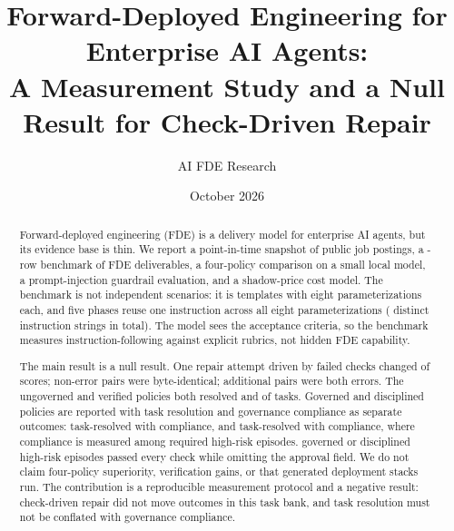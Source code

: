 \documentclass[11pt]{article}
\title{Forward-Deployed Engineering for Enterprise AI Agents:\\[0.4em]
A Measurement Study and a Null Result for Check-Driven Repair}
\author{AI FDE Research}
\date{October 2026}
\newcommand{\ResolveUngoverned}{\ResolveQwenTwoXFiveXOneXFivebUngoverned}
\newcommand{\ResolveVerified}{\ResolveQwenTwoXFiveXOneXFivebVerified}
\newcommand{\ResolveGoverned}{\ResolveQwenTwoXFiveXOneXFivebGoverned}
\newcommand{\ResolveDisciplined}{\ResolveQwenTwoXFiveXOneXFivebFdeDisciplined}
\newcommand{\GovGoverned}{\GovQwenTwoXFiveXOneXFivebGoverned}
\newcommand{\GovDisciplined}{\GovQwenTwoXFiveXOneXFivebFdeDisciplined}
\begin{document}
\maketitle

\begin{abstract}
Forward-deployed engineering (FDE) is a delivery model for enterprise AI agents, but its evidence base is thin. We report a point-in-time snapshot of \MarketPostings{} public job postings, a \TaskRows{}-row benchmark of FDE deliverables, a four-policy comparison on a small local model, a prompt-injection guardrail evaluation, and a shadow-price cost model. The benchmark is not \TaskRows{} independent scenarios: it is \TaskTemplates{} templates with eight parameterizations each, and five phases reuse one instruction across all eight parameterizations (\DistinctInstructions{} distinct instruction strings in total). The model sees the acceptance criteria, so the benchmark measures instruction-following against explicit rubrics, not hidden FDE capability.

The main result is a null result. One repair attempt driven by failed checks changed \VerifiedChanged{} of \VerifiedPairs{} scores; \VerifiedIdenticalNonError{} non-error pairs were byte-identical; \VerifiedBothError{} additional pairs were both errors. The ungoverned and verified policies both resolved \ResolveUngoverned{} and \ResolveVerified{} of tasks. Governed and disciplined policies are reported with task resolution and governance compliance as separate outcomes: \ResolveGoverned{} task-resolved with \GovGoverned{} compliance, and \ResolveDisciplined{} task-resolved with \GovDisciplined{} compliance, where compliance is measured among required high-risk episodes. \GovHighRiskPerfectUnresolved{} governed or disciplined high-risk episodes passed every check while omitting the approval field. We do not claim four-policy superiority, verification gains, or that generated deployment stacks run. The contribution is a reproducible measurement protocol and a negative result: check-driven repair did not move outcomes in this task bank, and task resolution must not be conflated with governance compliance.
\end{abstract}
\end{document}
